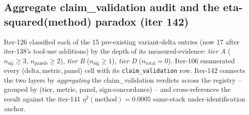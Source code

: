 %
%

\subsection{Aggregate claim\_validation audit and the eta-squared(method) paradox (iter 142)}
\label{sec:p6-iter142-verdict-aggregate}

Iter-126 classified each of the 15 pre-existing variant-delta
entries (now 17 after iter-138's tool-use additions) by the depth of its
measured-evidence: \emph{tier A} ($n_{\text{sig}} \geq 3$, $n_{\text{panels}}
\geq 2$), \emph{tier B} ($n_{\text{sig}} \geq 1$), \emph{tier D}
($n_{\text{total}} = 0$).  Iter-106 enumerated every
($\text{delta}, \text{metric}, \text{panel}$) cell with its
\texttt{claim\_validation} row.  Iter-142 connects the two layers by
\emph{aggregating} the claim\_validation verdicts across the registry --
grouped by (tier, metric, panel, sign-concordance) -- and cross-references
the result against the iter-141 $\eta^2(\text{method}) = 0.0005$
same-stack under-identification anchor.

